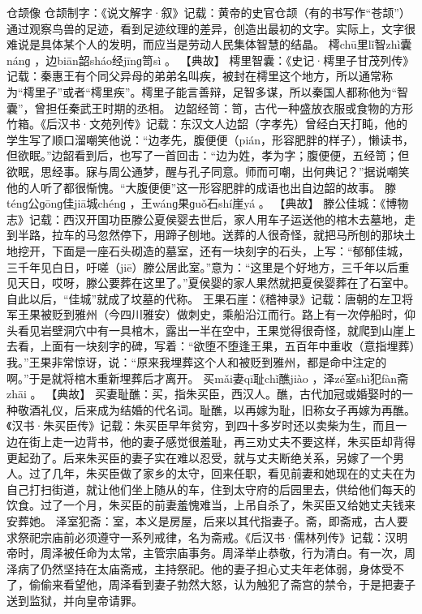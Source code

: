 \documentclass[12pt,UTF8]{ctexbook}
\begin{document}
仓颉像
仓颉制字：《说文解字·叙》记载：黄帝的史官仓颉（有的书写作“苍颉”）通过观察鸟兽的足迹，看到足迹纹理的差异，创造出最初的文字。实际上，文字很难说是具体某个人的发明，而应当是劳动人民集体智慧的结晶。
樗chū里lǐ智zhì囊nánɡ
，边biān韶sháo经jīnɡ笥sì
。
【典故】
樗里智囊：《史记·樗里子甘茂列传》记载：秦惠王有个同父异母的弟弟名叫疾，被封在樗里这个地方，所以通常称为“樗里子”或者“樗里疾”。樗里子能言善辩，足智多谋，所以秦国人都称他为“智囊”，曾担任秦武王时期的丞相。
边韶经笥：笥，古代一种盛放衣服或食物的方形竹箱。《后汉书·文苑列传》记载：东汉文人边韶（字孝先）曾经白天打盹，他的学生写了顺口溜嘲笑他说：“边孝先，腹便便（pián，形容肥胖的样子），懒读书，但欲眠。”边韶看到后，也写了一首回击：“边为姓，孝为字；腹便便，五经笥；但欲眠，思经事。寐与周公通梦，醒与孔子同意。师而可嘲，出何典记？”据说嘲笑他的人听了都很惭愧。“大腹便便”这一形容肥胖的成语也出自边韶的故事。
滕ténɡ公ɡōnɡ佳jiā城chénɡ
，王wánɡ果ɡuǒ石shí崖yá
。
【典故】
滕公佳城：《博物志》记载：西汉开国功臣滕公夏侯婴去世后，家人用车子运送他的棺木去墓地，走到半路，拉车的马忽然停下，用蹄子刨地。送葬的人很奇怪，就把马所刨的那块土地挖开，下面是一座石头砌造的墓室，还有一块刻字的石头，上写：“郁郁佳城，三千年见白日，吁嗟（jiē）滕公居此室。”意为：“这里是个好地方，三千年以后重见天日，哎呀，滕公要葬在这里了。”夏侯婴的家人果然就把夏侯婴葬在了石室中。自此以后，“佳城”就成了坟墓的代称。
王果石崖：《稽神录》记载：唐朝的左卫将军王果被贬到雅州（今四川雅安）做刺史，乘船沿江而行。路上有一次停船时，仰头看见岩壁洞穴中有一具棺木，露出一半在空中，王果觉得很奇怪，就爬到山崖上去看，上面有一块刻字的碑，写着：“欲堕不堕逢王果，五百年中重收（意指埋葬）我。”王果非常惊讶，说：“原来我埋葬这个人和被贬到雅州，都是命中注定的啊。”于是就将棺木重新埋葬后才离开。
买mǎi妻qī耻chǐ醮jiào
，泽zé室shì犯fàn斋zhāi
。
【典故】
买妻耻醮：买，指朱买臣，西汉人。醮，古代加冠或婚娶时的一种敬酒礼仪，后来成为结婚的代名词。耻醮，以再嫁为耻，旧称女子再嫁为再醮。《汉书·朱买臣传》记载：朱买臣早年贫穷，到四十多岁时还以卖柴为生，而且一边在街上走一边背书，他的妻子感觉很羞耻，再三劝丈夫不要这样，朱买臣却背得更起劲了。后来朱买臣的妻子实在难以忍受，就与丈夫断绝关系，另嫁了一个男人。过了几年，朱买臣做了家乡的太守，回来任职，看见前妻和她现在的丈夫在为自己打扫街道，就让他们坐上随从的车，住到太守府的后园里去，供给他们每天的饮食。过了一个月，朱买臣的前妻羞愧难当，上吊自杀了，朱买臣又给她丈夫钱来安葬她。
泽室犯斋：室，本义是房屋，后来以其代指妻子。斋，即斋戒，古人要求祭祀宗庙前必须遵守一系列戒律，名为斋戒。《后汉书·儒林列传》记载：汉明帝时，周泽被任命为太常，主管宗庙事务。周泽举止恭敬，行为清白。有一次，周泽病了仍然坚持在太庙斋戒，主持祭祀。他的妻子担心丈夫年老体弱，身体受不了，偷偷来看望他，周泽看到妻子勃然大怒，认为触犯了斋宫的禁令，于是把妻子送到监狱，并向皇帝请罪。
\end{document}
